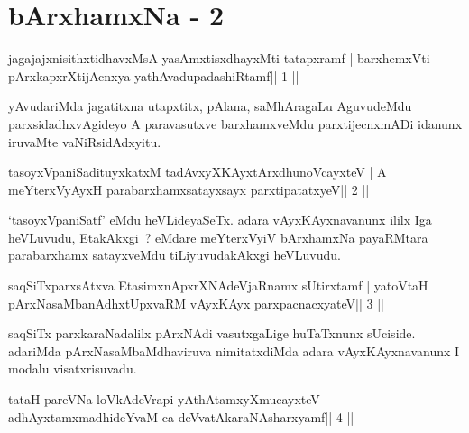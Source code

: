 \chapter{bArxhamxNa - 2}


\begin{shl}
jagajajxnisithxtidhavxMsA yasAmxtisxdhayxMti tatapxramf |
barxhemxVti pArxkapxrXtijAcnxya yathAvadupadashiRtamf\hfill || 1 ||
\end{shl}

\begin{artha}
yAvudariMda jagatitxna utapxtitx, pAlana, saMhAragaLu AguvudeMdu
parxsidadhxvAgideyo A paravasutxve barxhamxveMdu parxtijecnxmADi
idanunx iruvaMte vaNiRsidAdxyitu.
\end{artha}

\begin{shl}
tasoyxVpaniSadituyxkatxM tadAvxyXKAyx\s tArxdhunoVcayxteV |
A meYterxVyAyxH parabarxhamxsatayxsayx parxtipatatxyeV\hfill || 2 ||
\end{shl}

\begin{artha}
`tasoyxVpaniSatf' eMdu heVLideyaSeTx. adara vAyxKAyxnavanunx ililx Iga   heVLuvudu, EtakAkxgi~? eMdare meYterxVyiV bArxhamxNa payaRMtara   parabarxhamx satayxveMdu tiLiyuvudakAkxgi heVLuvudu.
\end{artha}




\begin{shl}
saqSiTxparxsAtxva EtasimxnApxrXNAdeVjaRnamx sUtirxtamf |
yatoV\s taH pArxNasaMbanAdhxtUpxvaRM vAyxKAyx parxpacnacxyateV\hfill || 3 ||
\end{shl}

\begin{artha}
saqSiTx parxkaraNadalilx pArxNAdi vasutxgaLige huTaTxnunx sUciside. adariMda pArxNasaMbaMdhaviruva nimitatxdiMda adara vAyxKAyxnavanunx I modalu visatxrisuvadu.
\end{artha}

\begin{shl}
tataH pareVNa loVkAdeVrapi yAthAtamxyXmucayxteV |
adhAyxtamxmadhideYvaM ca deVvatAkaraNAsharxyamf\hfill || 4 ||
\end{shl}

